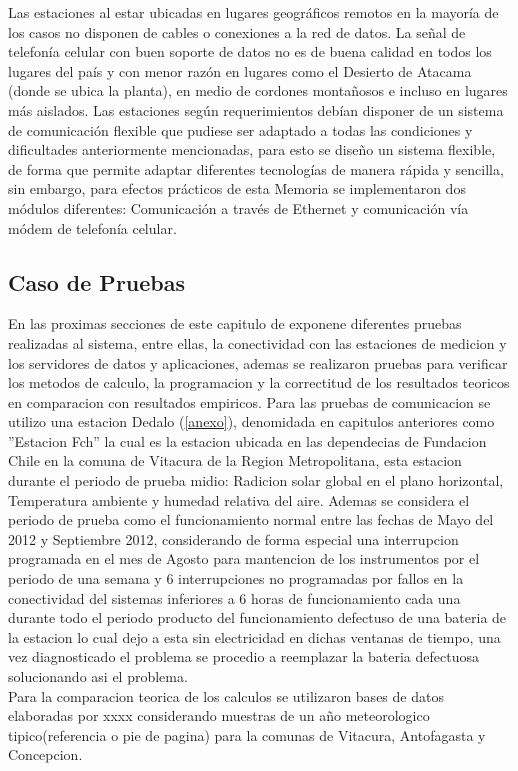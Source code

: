 Las estaciones al estar ubicadas en lugares geográficos remotos en la mayoría de los casos no disponen de cables o conexiones a la red de datos. La señal de telefonía celular con buen soporte de datos no es de buena calidad en todos los lugares del país y con menor razón en lugares como el Desierto de Atacama (donde se ubica la planta), en medio de cordones montañosos e incluso en lugares más aislados. Las estaciones según requerimientos debían disponer de un sistema de comunicación flexible que pudiese ser adaptado a todas las condiciones y dificultades anteriormente mencionadas, para esto se diseño un sistema flexible, de forma que permite adaptar diferentes tecnologías de manera rápida y sencilla, sin embargo, para efectos prácticos de esta Memoria se implementaron dos módulos diferentes: Comunicación a través de Ethernet y comunicación vía módem de telefonía celular.

\subsection{Caso de Pruebas}
En las proximas secciones de este capitulo de exponene diferentes pruebas realizadas al sistema, entre ellas, la conectividad con las estaciones de medicion y los servidores de datos y aplicaciones, ademas se realizaron pruebas para verificar los metodos de calculo, la programacion y la correctitud de los resultados teoricos en comparacion con resultados empiricos. Para las pruebas de comunicacion se utilizo una estacion Dedalo (\ref{anexo}), denomidada en capitulos anteriores como ''Estacion Fch'' la cual es la estacion ubicada en las dependecias de Fundacion Chile en la comuna de Vitacura de la Region Metropolitana, esta estacion durante el periodo de prueba midio: Radicion solar global en el plano horizontal, Temperatura ambiente y humedad relativa del aire. Ademas se considera el periodo de prueba como el funcionamiento normal entre las fechas de Mayo del 2012 y Septiembre 2012, considerando de forma especial una interrupcion programada en el mes de Agosto para mantencion de los instrumentos por el periodo de una semana y 6 interrupciones no programadas por fallos en la conectividad del sistemas inferiores a 6 horas de funcionamiento cada una durante todo el periodo producto del funcionamiento defectuso de una bateria de la estacion lo cual dejo a esta sin electricidad en dichas ventanas de tiempo, una vez diagnosticado el problema se procedio a reemplazar la bateria defectuosa solucionando asi el problema.\\
Para la comparacion teorica de los calculos se utilizaron bases de datos elaboradas por xxxx considerando muestras de un año meteorologico tipico(referencia o pie de pagina) para la comunas de Vitacura, Antofagasta y Concepcion.  
 
